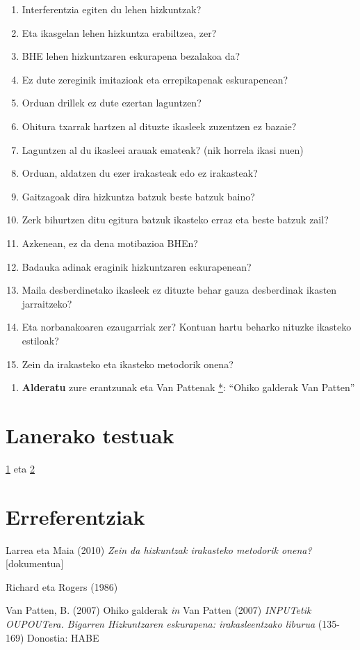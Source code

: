 \documentclass[
]{book}
\providecommand{\tightlist}{%
  \setlength{\itemsep}{0pt}\setlength{\parskip}{0pt}}
\begin{document}
\begin{enumerate}
\def\labelenumi{\arabic{enumi}.}
\tightlist
\item
  Interferentzia egiten du lehen hizkuntzak?
\item
  Eta ikasgelan lehen hizkuntza erabiltzea, zer?
\item
  BHE lehen hizkuntzaren eskurapena bezalakoa da?
\item
  Ez dute zereginik imitazioak eta errepikapenak eskurapenean?
\item
  Orduan drillek ez dute ezertan laguntzen?
\item
  Ohitura txarrak hartzen al dituzte ikasleek zuzentzen ez bazaie?
\item
  Laguntzen al du ikasleei arauak emateak? (nik horrela ikasi nuen)
\item
  Orduan, aldatzen du ezer irakasteak edo ez irakasteak?
\item
  Gaitzagoak dira hizkuntza batzuk beste batzuk baino?
\item
  Zerk bihurtzen ditu egitura batzuk ikasteko erraz eta beste batzuk zail?
\item
  Azkenean, ez da dena motibazioa BHEn?
\item
  Badauka adinak eraginik hizkuntzaren eskurapenean?
\item
  Maila desberdinetako ikasleek ez dituzte behar gauza desberdinak ikasten jarraitzeko?
\item
  Eta norbanakoaren ezaugarriak zer? Kontuan hartu beharko nituzke ikasteko estiloak?
\item
  Zein da irakasteko eta ikasteko metodorik onena?
\end{enumerate}

\begin{enumerate}
\def\labelenumi{\alph{enumi}.}
\setcounter{enumi}{2}
\tightlist
\item
  \textbf{Alderatu} zure erantzunak eta Van Pattenak \href{../assets/Ohiko_galderak_Van_Patten.pdf}{*}: ``Ohiko galderak Van Patten''
\end{enumerate}

\hypertarget{lanerako-testuak}{%
\section{Lanerako testuak}\label{lanerako-testuak}}

\href{../apunteak/assets/06/MetodorikOnena.pdf}{1} eta \href{../apunteak/assets/06/Ohiko_galderak_Van_Patten.pdf}{2}

\hypertarget{erreferentziak-1}{%
\section{Erreferentziak}\label{erreferentziak-1}}

Larrea eta Maia (2010) \emph{Zein da hizkuntzak irakasteko metodorik onena?} {[}dokumentua{]}

Richard eta Rogers (1986)

Van Patten, B. (2007) Ohiko galderak \emph{in} Van Patten (2007) \emph{INPUTetik OUPOUTera. Bigarren Hizkuntzaren eskurapena: irakasleentzako liburua} (135-169) Donostia: HABE
\end{document}
